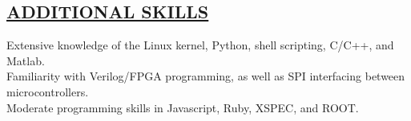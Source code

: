 \documentclass{res}
\begin{document}
\begin{resume}


\section{\underline{ADDITIONAL SKILLS}}
\vspace{1.5mm}
    Extensive knowledge of the Linux kernel, Python, shell scripting, C/C++, and Matlab. \\
    Familiarity with Verilog/FPGA programming, as well as SPI interfacing between microcontrollers.\\
    Moderate programming skills in Javascript, Ruby, XSPEC, and ROOT. \\



\end{resume}
\end{document}
